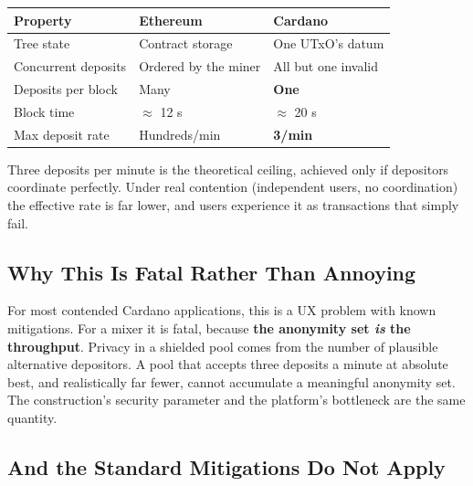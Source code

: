 \begin{center}
\begin{tabular}{lll}
  \hline
  \textbf{Property} & \textbf{Ethereum} & \textbf{Cardano} \\
  \hline
  Tree state          & Contract storage      & One UTxO's datum \\
  Concurrent deposits & Ordered by the miner  & All but one invalid \\
  Deposits per block  & Many                  & \textbf{One} \\
  Block time          & $\approx$ 12 s        & $\approx$ 20 s \\
  Max deposit rate    & Hundreds/min          & \textbf{3/min} \\
  \hline
\end{tabular}
\end{center}

Three deposits per minute is the theoretical ceiling, achieved only if depositors
coordinate perfectly. Under real contention (independent users, no
coordination) the effective rate is far lower, and users experience it as
transactions that simply fail.

\subsection*{Why This Is Fatal Rather Than Annoying}

For most contended Cardano applications, this is a UX problem with known
mitigations. For a mixer it is fatal, because \textbf{the anonymity set
\emph{is} the throughput}. Privacy in a shielded pool comes from the number of
plausible alternative depositors. A pool that accepts three deposits a minute at
absolute best, and realistically far fewer, cannot accumulate a meaningful
anonymity set. The construction's security parameter and the platform's
bottleneck are the same quantity.

\subsection*{And the Standard Mitigations Do Not Apply}

